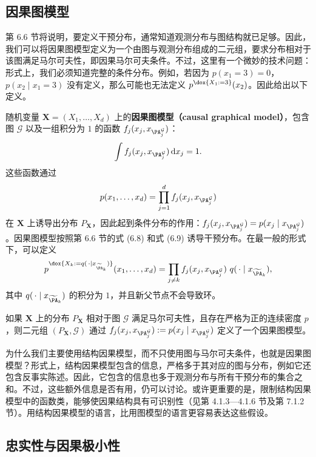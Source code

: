 \subsection{因果图模型}

第 6.6 节将说明，要定义干预分布，通常知道观测分布与图结构就已足够。因此，我们可以将因果图模型定义为一个由图与观测分布组成的二元组，要求分布相对于该图满足马尔可夫性，即因果马尔可夫条件。不过，这里有一个微妙的技术问题：形式上，我们必须知道完整的条件分布。例如，若因为 $p(x_1=3)=0$，$p(x_2\mid x_1=3)$ 没有定义，那么可能也无法定义 $p^{\dox{X_1:=3}}(x_2)$。因此给出以下定义。

\begin{definition}[因果图模型]
随机变量 $\mathbf X=(X_1,\ldots,X_d)$ 上的\textbf{因果图模型（causal graphical model）}，包含图 $\mathcal G$ 以及一组积分为 $1$ 的函数 $f_j(x_j,x_{\PA_j^{\mathcal G}})$：
\[
 \int f_j(x_j,x_{\PA_j^{\mathcal G}})\,\mathrm d x_j=1.
\]
这些函数通过
\[
 p(x_1,\ldots,x_d)=\prod_{j=1}^d f_j(x_j,x_{\PA_j^{\mathcal G}})
\]
在 $\mathbf X$ 上诱导出分布 $P_{\mathbf X}$，因此起到条件分布的作用：$f_j(x_j,x_{\PA_j^{\mathcal G}})=p(x_j\mid x_{\PA_j^{\mathcal G}})$。因果图模型按照第 6.6 节的式 (6.8) 和式 (6.9) 诱导干预分布。在最一般的形式下，可以定义
\[
 p^{\dox{X_k:=q(\,\cdot\mid x_{\widetilde{\PA}_k})}}(x_1,\ldots,x_d)
 =\prod_{j\ne k}f_j(x_j,x_{\PA_j^{\mathcal G}})
 \ q(\,\cdot\mid x_{\widetilde{\PA}_k}),
\]
其中 $q(\,\cdot\mid x_{\widetilde{\PA}_k})$ 的积分为 $1$，并且新父节点不会导致环。
\end{definition}

如果 $\mathbf X$ 上的分布 $P_{\mathbf X}$ 相对于图 $\mathcal G$ 满足马尔可夫性，且存在严格为正的连续密度 $p$，则二元组 $(P_{\mathbf X},\mathcal G)$ 通过 $f_j(x_j,x_{\PA_j^{\mathcal G}}):=p(x_j\mid x_{\PA_j^{\mathcal G}})$ 定义了一个因果图模型。

为什么我们主要使用结构因果模型，而不只使用图与马尔可夫条件，也就是因果图模型？形式上，结构因果模型包含的信息，严格多于其对应的图与分布，例如它还包含反事实陈述。因此，它包含的信息也多于观测分布与所有干预分布的集合之和。不过，这些额外信息是否有用，仍可以讨论。或许更重要的是，限制结构因果模型中的函数类，能够使因果结构具有可识别性（见第 4.1.3—4.1.6 节及第 7.1.2 节）。用结构因果模型的语言，比用图模型的语言更容易表达这些假设。

\subsection{忠实性与因果极小性}

